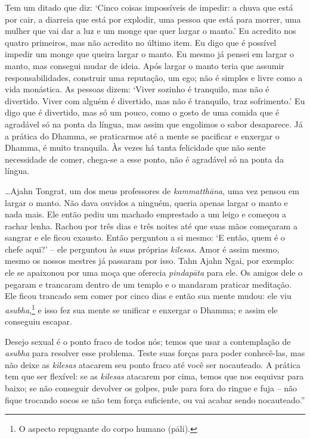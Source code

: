 Tem um ditado que diz: `Cinco coisas impossíveis de impedir: a chuva que
está por cair, a diarreia que está por explodir, uma pessoa que está
para morrer, uma mulher que vai dar a luz e um monge que quer largar o
manto.' Eu acredito nos quatro primeiros, mas não acredito no último
item. Eu digo que é possível impedir um monge que queira largar o manto.
Eu mesmo já pensei em largar o manto, mas consegui mudar de ideia. Após
largar o manto teria que assumir responsabilidades, construir uma
reputação, um ego; não é simples e livre como a vida monástica. As
pessoas dizem: `Viver sozinho é tranquilo, mas não é divertido. Viver
com alguém é divertido, mas não é tranquilo, traz sofrimento.' Eu digo
que é divertido, mas só um pouco, como o gosto de uma comida que é
agradável só na ponta da língua, mas assim que engolimos o sabor
desaparece. Já a prática do Dhamma, se praticarmos até a mente se
pacificar e enxergar o Dhamma, é muito tranquila. Às vezes há tanta
felicidade que não sente necessidade de comer, chega-se a esse ponto,
não é agradável só na ponta da língua.

\ldots{}Ajahn Tongrat, um dos meus professores de \emph{kammatthāna},
uma vez pensou em largar o manto. Não dava ouvidos a ninguém, queria
apenas largar o manto e nada mais. Ele então pediu um machado emprestado
a um leigo e começou a rachar lenha. Rachou por três dias e três noites
até que suas mãos começaram a sangrar e ele ficou exausto. Então
perguntou a si mesmo: `E então, quem é o chefe aqui?' -- ele perguntou
às suas próprias \emph{kilesas}. Amor é assim mesmo, mesmo os nossos
mestres já passaram por isso. Tahn Ajahn Ngai, por exemplo: ele se
apaixonou por uma moça que oferecia \emph{pindapāta} para ele. Os amigos
dele o pegaram e trancaram dentro de um templo e o mandaram praticar
meditação. Ele ficou trancado sem comer por cinco dias e então sua mente
mudou: ele viu \emph{asubha},\footnote{O aspecto repugnante do corpo
  humano (pāli).} e isso fez sua mente se unificar e enxergar o
Dhamma; e assim ele conseguiu escapar.

Desejo sexual é o ponto fraco de todos nós; temos que usar a
contemplação de \emph{asubha} para resolver esse problema. Teste suas
forças para poder conhecê-las, mas não deixe as \emph{kilesas} atacarem
seu ponto fraco até você ser nocauteado. A prática tem que ser flexível:
se as \emph{kilesas} atacarem por cima, temos que nos esquivar para
baixo; se não conseguir devolver os golpes, pule para fora do ringue e
fuja -- não fique trocando socos se não tem força suficiente, ou vai
acabar sendo nocauteado.''


